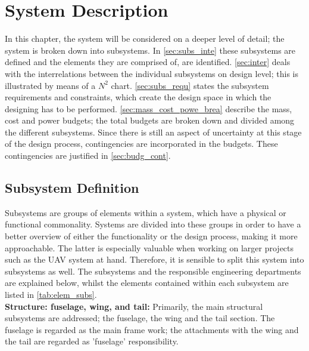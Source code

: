 \chapter{System Description}
\setlength{\parindent}{15pt}
\label{ch:syst_desc}

In this chapter, the system will be considered on a deeper level of detail; the system is broken down into subsystems. In \autoref{sec:subs_inte} these subsystems are defined and the elements they are comprised of, are identified. \autoref{sec:inter} deals with the interrelations between the individual subsystems on design level; this is illustrated by means of a $N^2$ chart. \autoref{sec:subs_requ} states the subsystem requirements and constraints, which create the design space in which the designing has to be performed. \autoref{sec:mass_cost_powe_brea} describe the mass, cost and power budgets; the total budgets are broken down and divided among the different subsystems. Since there is still an aspect of uncertainty at this stage of the design process, contingencies are incorporated in the budgets. These contingencies are justified in \autoref{sec:budg_cont}.

\section{Subsystem Definition}
\label{sec:subs_inte}

Subsystems are groups of elements within a system, which have a physical or functional commonality. Systems are divided into these groups in order to have a better overview of either the functionality or the design process, making it more approachable. The latter is especially valuable when working on larger projects such as the UAV system at hand. Therefore, it is sensible to split this system into subsystems as well. The subsystems and the responsible engineering departments are explained below, whilst the elements contained within each subsystem are listed in \autoref{tab:elem_subs}.\\


\noindent \textbf{Structure: fuselage, wing, and tail:} Primarily, the main structural subsystems are addressed; the fuselage, the wing and the tail section. The fuselage is regarded as the main frame work; the attachments with the wing and the tail are regarded as 'fuselage' responsibility.

